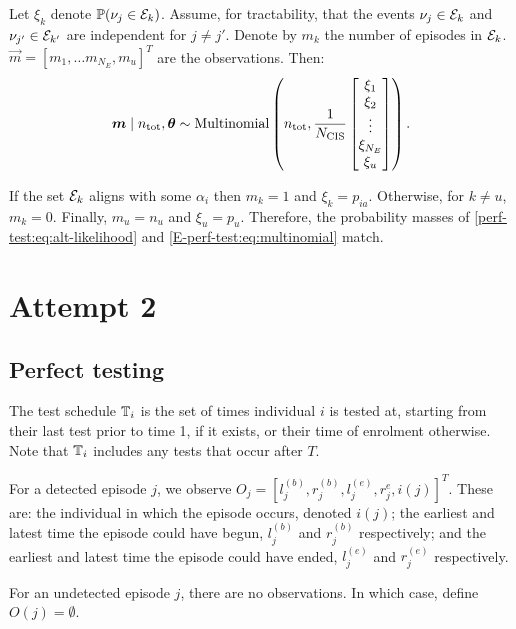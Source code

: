 \documentclass[thesis.tex]{subfiles}
\begin{document}
Let $\xi_k$ denote $\operatorname{\mathbb{P}}(\nu_j \in \mathcal{E}_k)$.
Assume, for tractability, that the events $\nu_j \in \mathcal{E}_k$ and $\nu_{j'} \in \mathcal{E}_{k'}$ are independent for $j \neq j'$.
Denote by $m_k$ the number of episodes in $\mathcal{E}_k$.
$\vec{m} = [m_1, \dots m_{N_E}, m_u]^T$ are the observations.
Then:
\begin{align}
  \bm{m}
  \mid n_\text{tot}, \bm{\theta}
  \sim
  \operatorname{Multinomial}\left(
    n_\text{tot},
    \frac{1}{N_\text{CIS}}
    \begin{bmatrix}
        \xi_1 \\ \xi_2 \\ \vdots \\ \xi_{N_E} \\ \xi_u
    \end{bmatrix}
  \right).
  \label{perf-test:eq:alt-likelihood}
\end{align}

If the set $\mathcal{E}_k$ aligns with some $\alpha_i$ then $m_k = 1$ and $\xi_k = p_{ia}$.
Otherwise, for $k \neq u$, $m_k = 0$.
Finally, $m_u = n_u$ and $\xi_u = p_u$.
Therefore, the probability masses of \cref{perf-test:eq:alt-likelihood} and \cref{E-perf-test:eq:multinomial} match.



\section{Attempt 2}

\subsection{Perfect testing}

The test schedule $\mathbb{T}_i$ is the set of times individual $i$ is tested at, starting from their last test prior to time 1, if it exists, or their time of enrolment otherwise.
Note that $\mathbb{T}_i$ includes any tests that occur after $T$.

For a detected episode $j$, we observe $O_j = [l_j^{(b)}, r_j^{(b)}, l_j^{(e)}, r_j^{e}, i(j)]^T$.
These are: the individual in which the episode occurs, denoted $i(j)$; the earliest and latest time the episode could have begun, $l_j^{(b)}$ and $r_j^{(b)}$ respectively; and the earliest and latest time the episode could have ended, $l_j^{(e)}$ and $r_j^{(e)}$ respectively.

For an undetected episode $j$, there are no observations.
In which case, define $O(j) = \emptyset$.
\end{document}

